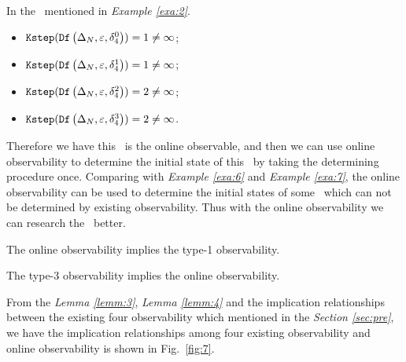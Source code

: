 \begin{example}
In the \BCN\ mentioned in {\em Example \ref{exa:2}}.  
 \begin{itemize}
 \item ${\tt Kstep}({\tt Df}\left(\Delta_N,\varepsilon, \delta_{4}^0\right))=1\ne \infty$;
 \item ${\tt Kstep}({\tt Df}\left(\Delta_N,\varepsilon, \delta_{4}^1\right))=1\ne \infty$;
 \item ${\tt Kstep}({\tt Df}\left(\Delta_N,\varepsilon, \delta_{4}^2\right))=2\ne \infty$;
 \item ${\tt Kstep}({\tt Df}\left(\Delta_N,\varepsilon, \delta_{4}^3\right))=2\ne \infty$.
 \end{itemize}
 
Therefore we have this \BCN\ is the online observable, and then we can use online observability to determine the initial state of this \BCN\ by taking the determining procedure once. Comparing with {\em Example \ref{exa:6}} and {\em Example \ref{exa:7}}, the online observability can be used to determine the initial states of some \BCNs\ which can not be determined by existing observability. Thus with the online observability we can research the \BCNs\ better.
\label{exa:10}
\end{example}  

\begin{lemma}
The online observability implies the  type-1 observability.
\label{lemm:3}
\end{lemma}


\begin{lemma}
The  type-3 observability implies the online observability.
\label{lemm:4}
\end{lemma}

From the {\em Lemma \ref{lemm:3}}, {\em Lemma \ref{lemm:4}}  and the implication relationships between the existing four observability which mentioned in the {\em Section \ref{sec:pre}}, we have the implication relationships among four existing observability and online observability is shown in Fig.~\ref{fig:7}.

